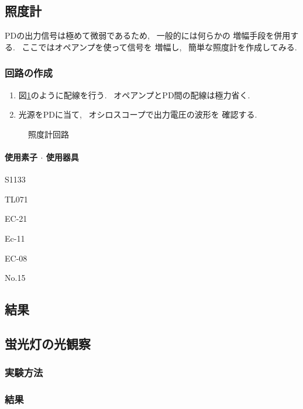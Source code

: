 \documentclass[titlepage]{jsarticle}
\begin{document}
    \subsection{照度計}
        PDの出力信号は極めて微弱であるため, ~一般的には何らかの
        増幅手段を併用する. ~ここではオペアンプを使って信号を
        増幅し, ~簡単な照度計を作成してみる.

        \subsubsection{回路の作成}
            \begin{enumerate}
                \item 図\ref{fig:照度計}のように配線を行う.
                    ~オペアンプとPD間の配線は極力省く.
                \item 光源をPDに当て, ~オシロスコープで出力電圧の波形を
                    確認する.
            \end{enumerate}

            \begin{figure}[ht]
                \centering
                \caption{照度計回路}
                \label{fig:照度計}
            \end{figure}

            \paragraph{使用素子 $\cdot$ 使用器具}
                \begin{description}
                    \setlength{\leftskip}{1.5em}
                    \item[PD] S1133
                    \item[オペアンプ] TL071
                    \item[デジタルマルチメータ] EC-21
                    \item[直流電源] Ec-11
                    \item[ブレッドボード] EC-08
                    \item[オシロスコープ] No.15  
                \end{description}

        \subsection{結果}
            

    \subsection{蛍光灯の光観察}
        \subsubsection{実験方法}

        \subsubsection{結果}
\end{document}
